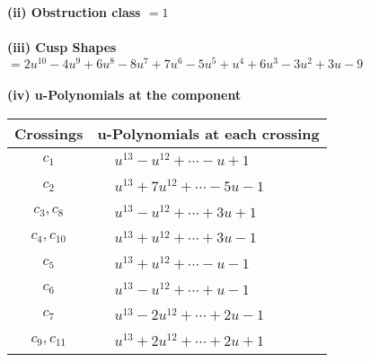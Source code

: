 \documentclass[1p]{elsarticle_modified}
\theoremstyle{definition}
\begin{document}
\flushleft \textbf{(ii) Obstruction class $= 1$}\\~\\
\flushleft \textbf{(iii) Cusp Shapes $= 2 u^{10}-4 u^9+6 u^8-8 u^7+7 u^6-5 u^5+u^4+6 u^3-3 u^2+3 u-9$}\\~\\
\newpage\renewcommand{\arraystretch}{1}
\flushleft \textbf{(iv) u-Polynomials at the component}\newline \\
\begin{tabular}{m{50pt}|m{274pt}}
Crossings & \hspace{64pt}u-Polynomials at each crossing \\
\hline $$\begin{aligned}c_{1}\end{aligned}$$&$\begin{aligned}
&u^{13}- u^{12}+\cdots- u+1
\end{aligned}$\\
\hline $$\begin{aligned}c_{2}\end{aligned}$$&$\begin{aligned}
&u^{13}+7 u^{12}+\cdots-5 u-1
\end{aligned}$\\
\hline $$\begin{aligned}c_{3},c_{8}\end{aligned}$$&$\begin{aligned}
&u^{13}- u^{12}+\cdots+3 u+1
\end{aligned}$\\
\hline $$\begin{aligned}c_{4},c_{10}\end{aligned}$$&$\begin{aligned}
&u^{13}+u^{12}+\cdots+3 u-1
\end{aligned}$\\
\hline $$\begin{aligned}c_{5}\end{aligned}$$&$\begin{aligned}
&u^{13}+u^{12}+\cdots- u-1
\end{aligned}$\\
\hline $$\begin{aligned}c_{6}\end{aligned}$$&$\begin{aligned}
&u^{13}- u^{12}+\cdots+u-1
\end{aligned}$\\
\hline $$\begin{aligned}c_{7}\end{aligned}$$&$\begin{aligned}
&u^{13}-2 u^{12}+\cdots+2 u-1
\end{aligned}$\\
\hline $$\begin{aligned}c_{9},c_{11}\end{aligned}$$&$\begin{aligned}
&u^{13}+2 u^{12}+\cdots+2 u+1
\end{aligned}$\\
\hline
\end{tabular}\\~\\
\end{document}
